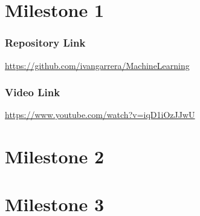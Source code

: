 \documentclass[twoside]{plantilla}
\begin{document}

\tableofcontents
\newpage
\part{Milestone 1}






\section{Repository Link}
\url{https://github.com/ivangarrera/MachineLearning}
\section{Video Link}
\url{https://www.youtube.com/watch?v=iqD1iOzJJwU}
\part{Milestone 2}



\part{Milestone 3}





\end{document}
